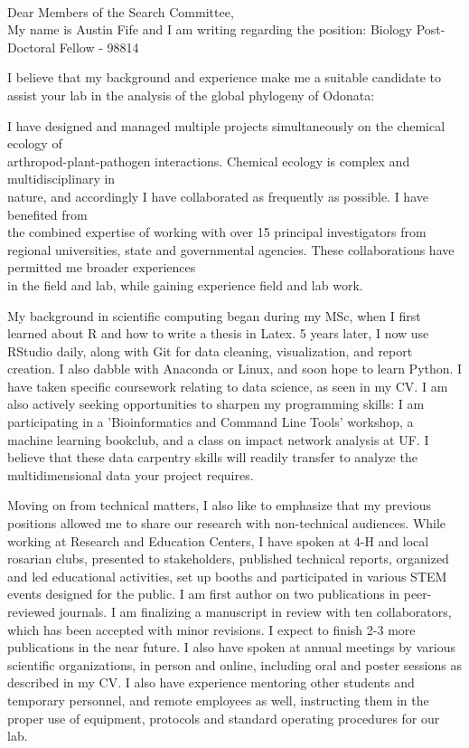 \documentclass[11pt]{letter} %
\begin{document}
\begin{letter}
\\
Dear Members of the Search Committee,\\

My name is Austin Fife and I am writing regarding the position: Biology Post-Doctoral Fellow - 98814

I believe that my background and experience make me a suitable candidate to assist your lab in the analysis of the global phylogeny of Odonata:

I have designed and managed multiple projects simultaneously on the chemical ecology of\\
arthropod-plant-pathogen interactions. Chemical ecology is complex and multidisciplinary
in\\
nature, and accordingly I have collaborated as frequently as possible. I have benefited from\\
the combined expertise of working with over 15 principal investigators from regional universities, state and governmental agencies. These collaborations have permitted me broader experiences\\
in the field and lab, while gaining experience field and lab work.  

My background in scientific computing began during my MSc, when I first learned about R and how to write a thesis in Latex. 5 years later, I now use RStudio daily, along with Git for data cleaning, visualization, and report creation. I also dabble with Anaconda or Linux, and soon hope to learn Python. I have taken specific coursework relating to data science, as seen in my CV. I am also actively seeking opportunities to sharpen my programming skills: I am participating in a 'Bioinformatics and Command Line Tools' workshop, a machine learning bookclub, and a class on impact network analysis at UF. I believe that these data carpentry skills will readily transfer to analyze the multidimensional data your project requires. 

Moving on from technical matters, I also like to emphasize that my previous positions allowed me to share our research with non-technical audiences. While working at Research and Education Centers, I have spoken at 4-H and local rosarian clubs, presented to stakeholders, published technical reports, organized and led educational activities, set up booths and participated in various STEM events designed for the public. I am first author on two publications in peer-reviewed journals. I am finalizing a manuscript in review with ten collaborators, which has been accepted with minor revisions. I expect to finish 2-3 more publications in the near future. I also have spoken at annual meetings by various scientific organizations, in person and online, including oral and poster sessions as described in my CV. I also have experience mentoring other students and temporary personnel, and remote employees as well, instructing them in the proper use of equipment, protocols and standard operating procedures for our lab.


\end{letter}
\end{document}

